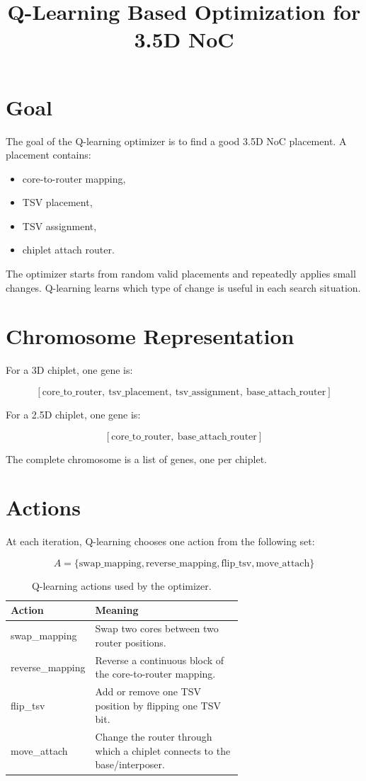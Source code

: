 \documentclass[11pt]{article}
\title{Q-Learning Based Optimization for 3.5D NoC}
\author{}
\date{}
\begin{document}
\maketitle

\section{Goal}

The goal of the Q-learning optimizer is to find a good 3.5D NoC placement.
A placement contains:

\begin{itemize}[noitemsep]
    \item core-to-router mapping,
    \item TSV placement,
    \item TSV assignment,
    \item chiplet attach router.
\end{itemize}

The optimizer starts from random valid placements and repeatedly applies small
changes. Q-learning learns which type of change is useful in each search
situation.

\section{Chromosome Representation}

For a 3D chiplet, one gene is:

\[
[\text{core\_to\_router},\ \text{tsv\_placement},\ \text{tsv\_assignment},\ \text{base\_attach\_router}]
\]

For a 2.5D chiplet, one gene is:

\[
[\text{core\_to\_router},\ \text{base\_attach\_router}]
\]

The complete chromosome is a list of genes, one per chiplet.

\section{Actions}

At each iteration, Q-learning chooses one action from the following set:

\[
A =
\{
\text{swap\_mapping},
\text{reverse\_mapping},
\text{flip\_tsv},
\text{move\_attach}
\}
\]

\begin{table}[h]
\centering
\begin{tabular}{>{\ttfamily}l p{0.65\linewidth}}
\toprule
Action & Meaning \\
\midrule
swap\_mapping & Swap two cores between two router positions. \\
reverse\_mapping & Reverse a continuous block of the core-to-router mapping. \\
flip\_tsv & Add or remove one TSV position by flipping one TSV bit. \\
move\_attach & Change the router through which a chiplet connects to the base/interposer. \\
\bottomrule
\end{tabular}
\caption{Q-learning actions used by the optimizer.}
\end{table}
\end{document}
